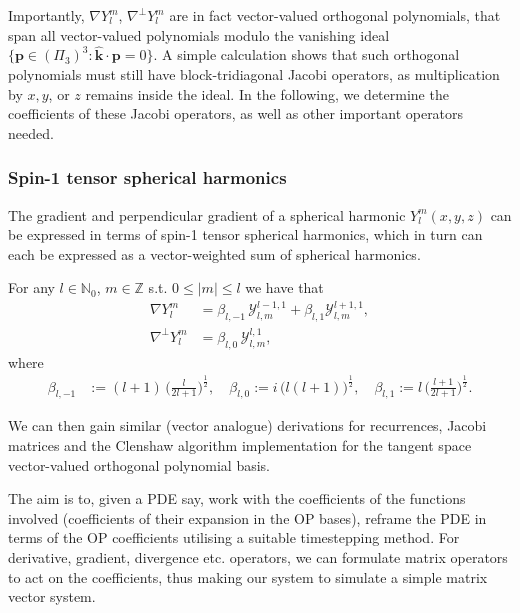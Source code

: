 \documentclass[11pt, oneside]{article}   	%
\newcommand{\half}{\frac{1}{2}}
\newcommand{\Z}{\mathbb{Z}}
\newcommand{\No}{\mathbb{N}_0}
\newcommand{\Ylm}{Y^m_l}
\newcommand{\gradYlm}{\nabla Y^m_l}
\newcommand{\gradpYlm}{\nabla^\perp Y^m_l}
\newcommand{\curlyy}{\bm{\mathcal{Y}}}
\newcommand{\blone}{\beta_{l, 1}}
\newcommand{\blzero}{\beta_{l, 0}}
\newcommand{\blmone}{\beta_{l, -1}}
\newcommand{\unitvec}{\hat{\bm{k}}}
\begin{document}
Importantly,  \(\gradYlm\), \(\gradpYlm\) are in fact vector-valued orthogonal polynomials, that span all vector-valued polynomials modulo the vanishing ideal $\{ \bm{p} \in (\Pi_3)^3  : \unitvec \cdot \bm{p} = 0 \}$. A simple calculation shows that such orthogonal polynomials must still have block-tridiagonal Jacobi operators, as multiplication by $x, y$, or $z$ remains inside the ideal. In the following, we determine the coefficients of these Jacobi operators, as well as other important operators needed.

\subsubsection{Spin-1 tensor spherical harmonics}

The gradient and perpendicular gradient of a spherical harmonic \(\Ylm(x,y,z)\) can be expressed in terms of spin-1 tensor spherical harmonics, which in turn can each be expressed as a vector-weighted sum of spherical harmonics.

For any \(l \in \No\), \(m \in \Z\) s.t. \(0 \le |m| \le l\) we have that
\begin{align}
\nabla \Ylm &= \blmone \, \curlyy^{l-1,1}_{l,m} + \blone \curlyy^{l+1,1}_{l,m}, \\
\nabla^\perp \Ylm &= \blzero \, \curlyy^{l,1}_{l,m},
\end{align}
where
\begin{align}
\blmone &:= (l+1) \, \Big(\frac{l}{2l+1}\Big)^\half, \quad
\blzero := i \, \big(l(l+1)\big)^\half, \quad
\blone := l \, \Big(\frac{l+1}{2l+1}\Big)^\half.
\end{align}

We can then gain similar (vector analogue) derivations for recurrences, Jacobi matrices and the Clenshaw algorithm implementation for the tangent space vector-valued orthogonal polynomial basis.

The aim is to, given a PDE say, work with the coefficients of the functions involved (coefficients of their expansion in the OP bases), reframe the PDE in terms of the OP coefficients utilising a suitable timestepping method. For derivative, gradient, divergence etc. operators, we can formulate matrix operators to act on the coefficients, thus making our system to simulate a simple matrix vector system.
\end{document}
